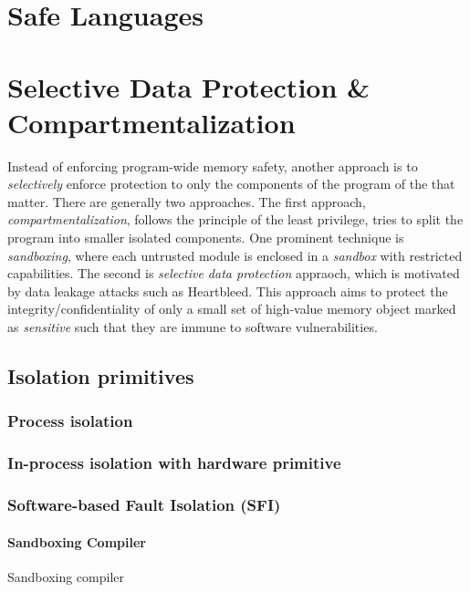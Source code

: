 \documentclass[11pt]{memoir}
\begin{document}
\section{Safe Languages}


\section{Selective Data Protection \& Compartmentalization}
Instead of enforcing program-wide memory safety, another approach is to \emph{selectively} enforce protection to only the components of the program of the that matter.
There are generally two approaches.
The first approach, \emph{compartmentalization}, follows the principle of the least privilege, tries to split the program into smaller isolated components.
One prominent technique is \emph{sandboxing}, where each untrusted module is enclosed in a \emph{sandbox} with restricted capabilities.
The second is \emph{selective data protection} appraoch, which is motivated by data leakage attacks such as Heartbleed.
This approach aims to protect the integrity/confidentiality of only a small set of high-value memory object marked as \emph{sensitive} such that they are immune to software vulnerabilities. 




\subsection{Isolation primitives}
\subsubsection{Process isolation}

\subsubsection{In-process isolation with hardware primitive}

\subsubsection{Software-based Fault Isolation (SFI)}

\paragraph{Sandboxing Compiler}
Sandboxing compiler 
\end{document}
